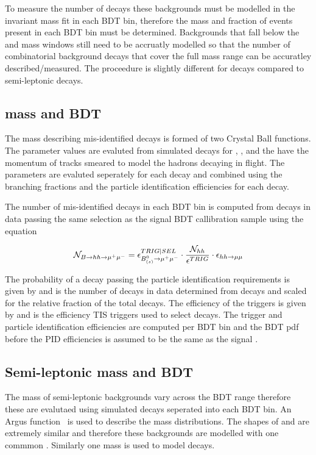 To measure the number of \bsmumu decays these backgrounds must be modelled in the invariant mass fit in each BDT bin, therefore the mass \pdfs and fraction of events present in each BDT bin must be determined.  Backgrounds that fall below the \bd and \bs mass windows still need to be accruatly modelled so that the number of combinatorial background decays that cover the full mass range can be accuratley described/measured. The proceedure is slightly different for \bhh decays compared to semi-leptonic decays.

\subsection{\bhh mass and BDT \pdfs}
The mass \pdf describing mis-identified \bhh decays is formed of two Crystal Ball functions. The parameter values are evaluted from simulated decays for \bdkpi, \bskk, \bdpipi and \bskpi the have the momentum of tracks smeared to model the hadrons decaying in flight. The parameters are evaluted seperately for each decay and combined using the branching fractions and the particle identification efficiencies for each decay.

The number of mis-identified \bhh decays in each BDT bin is computed from \bdkpi decays in data passing the same selection as the signal BDT callibration sample using the equation

\begin{equation}
\mathcal{N}_{B \to hh \to \mu^{+} \mu^{-}} = \epsilon^{TRIG|SEL}_{B^{0}_{(s)} \to \mu^{+} \mu^{-}} \cdot \frac{\mathcal{N}_{hh}}{\epsilon^{TRIG}} \cdot \epsilon_{hh\to \mu\mu}  \\
\label{eq:bhhprediction}
\end{equation}

The probability of a \bhh decay passing the \bmumu particle identification requirements is given by  and   is the number of \bhh decays in data determined from \bdkpi decays and scaled for the relative fraction of the total \bhh decays. The efficiency of the \bmumu triggers is given by and  is the efficiency TIS triggers used to select \bdkpi decays. The trigger and particle identification efficiencies are computed per BDT bin and the BDT pdf before the PID efficiencies is assumed to be the same as the signal \pdf. 


\subsection{Semi-leptonic mass and BDT \pdfs}
The mass \pdfs of semi-leptonic backgrounds vary across the BDT range therefore these \pdfs are evalutaed using simulated decays seperated into each BDT bin. An Argus function~\cite{} is used to describe the mass distributions. The shapes of \bdpimunu and \bsKmunu are extremely similar and therefore these backgrounds are modelled with one commmon \pdf. Similarly one mass \pdf is used to model \bpimumu decays.

